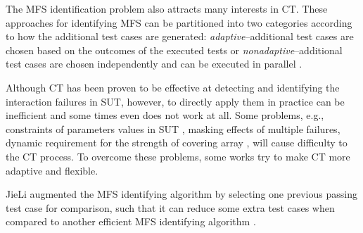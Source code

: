 \documentclass[10pt,journal,compsoc]{IEEEtran}
\begin{document}
The MFS identification problem also attracts many interests in CT. These approaches for identifying MFS can be partitioned into two categories \cite{colbourn2008locating} according to how the additional test cases are generated: \emph{adaptive}--additional test cases are chosen based on the outcomes of the executed tests \cite{shi2005software,nie2011minimal,ghandehari2012identifying,niu2013identifying,zhang2011characterizing,shakya2012isolating,wang2010adaptive,li2012improved}or \emph{nonadaptive}--additional test cases are chosen independently and can be executed in parallel \cite{yilmaz2006covering,colbourn2008locating,martinez2008algorithms,martinez2009locating,zhang2012faulty}.


Although CT has been proven to be effective at detecting and identifying the interaction failures in SUT, however, to directly apply them in practice can be inefficient and some times even does not work at all. Some problems, e.g., constraints of parameters values in SUT \cite{cohen2007exploiting,cohen2008constructing}, masking effects of multiple failures\cite{dumlu2011feedback,yilmaz2013reducing}, dynamic requirement for the strength of covering array \cite{fouche2009incremental}, will cause difficulty to the CT process. To overcome these problems, some works try to make CT more adaptive and flexible.


JieLi \cite{li2012improved} augmented the MFS identifying algorithm by selecting one previous passing test case for comparison, such that it can reduce some extra test cases when compared to another efficient MFS identifying algorithm \cite{zhang2011characterizing}.
\end{document}
